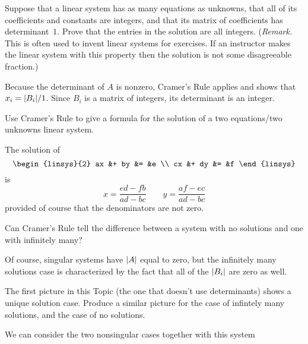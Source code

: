 \begin{exercises}
    Suppose that a linear system has as many equations as unknowns,
    that all of its coefficients and constants are integers, and that 
    its matrix
    of coefficients has determinant~\( 1 \).
    Prove that the entries in the solution are all integers.
    (\textit{Remark.}  
     This is often used to invent linear systems for exercises.
     If an instructor makes the linear system with this property
     then the solution is not some disagreeable fraction.)
    \begin{answer}
      Because the determinant of $A$ is nonzero, Cramer's Rule applies and
      shows that $x_i=\deter{B_i}/1$.  
      Since $B_i$ is a matrix of integers, its determinant is an integer.     
    \end{answer}
  \item 
    Use Cramer's Rule to give a formula for the solution of a
    two equations/two unknowns linear system.
    \begin{answer}
      The solution of
      \begin{equation*}
        \begin{linsys}{2}
           ax  &+  by  &=  &e  \\
           cx  &+  dy  &=  &f  
        \end{linsys}
      \end{equation*}
      is
      \begin{equation*}
        x=\frac{ed-fb}{ad-bc}
        \qquad
        y=\frac{af-ec}{ad-bc}
      \end{equation*}
      provided of course that the denominators are not zero.  
    \end{answer}
  \item
    Can Cramer's Rule tell the difference between a system with no
    solutions and one with infinitely many?
    \begin{answer}
      Of course, singular systems have \( \deter{A} \) equal to zero, but
      the infinitely many solutions case is characterized by the fact that
      all of the \( \deter{B_i} \) are zero as well.  
    \end{answer}
  \item 
    The first picture in this Topic (the one that doesn't use determinants)
    shows a unique solution case.
    Produce a similar picture for the case of infintely many solutions,
    and the case of no solutions.
    \begin{answer}
      We can consider the two nonsingular cases together with this
      system
      \begin{equation*}

\end{equation*}
\end{answer}
\end{exercises}
